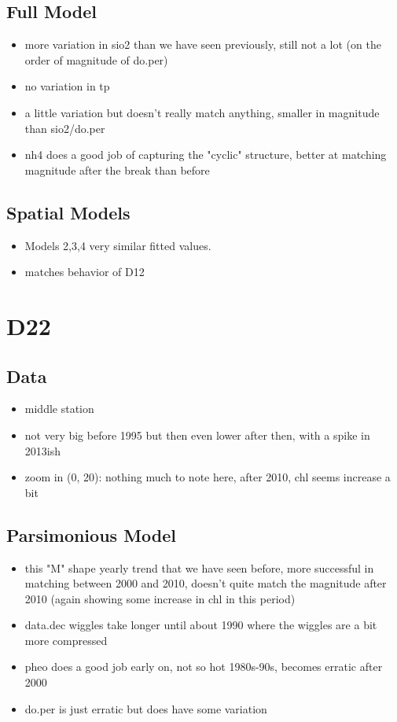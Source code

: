 \documentclass[12pt]{amsart}
\begin{document}
\subsection{Full Model}
\begin{itemize}
\item more variation in sio2 than we have seen previously, still not a lot (on the order of magnitude of do.per)
\item no variation in tp
\item a little variation but doesn't really match anything, smaller in magnitude than sio2/do.per
\item nh4 does a good job of capturing the "cyclic" structure, better at matching magnitude after the break than before
\end{itemize}

\subsection{Spatial Models}

\begin{itemize}
\item Models 2,3,4 very similar fitted values.
\item matches behavior of D12
\end{itemize}



\section{D22}
\subsection{Data}
\begin{itemize}
\item middle station
\item not very big before 1995 but then even lower after then, with a spike in 2013ish
\item zoom in (0, 20): nothing much to note here, after 2010, chl seems increase a bit
\end{itemize}
\subsection{Parsimonious Model}
\begin{itemize}
\item this "M" shape yearly trend that we have seen before, more successful in matching between 2000 and 2010, doesn't quite match the magnitude after 2010 (again showing some increase in chl in this period)
\item data.dec wiggles take longer until about 1990 where the wiggles are a bit more compressed
\item pheo does a good job early on, not so hot 1980s-90s, becomes erratic after 2000
\item do.per is just erratic but does have some variation
\end{itemize}
\end{document}
